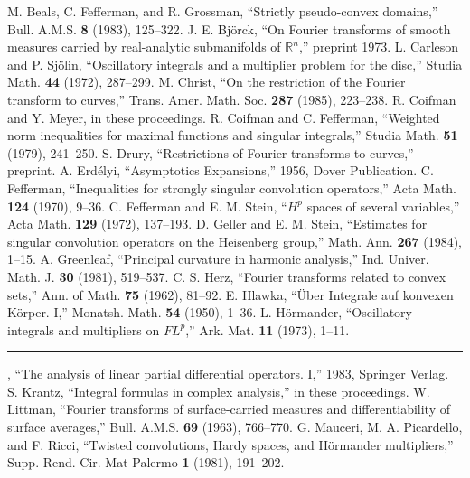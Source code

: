 \documentclass[
  BookTitleCN={傅里叶分析中的振动积分},
  BookTitleEN={Oscillatory Integrals in Fourier Analysis},
  OriginalAuthor={E.~M. Stein},
  OriginalEdition={Proc. Sympos. Pure Math. 35, Part~1},
  OriginalPublisher={American Mathematical Society},
  OriginalYear={1979},
  Translator={翻译及重排},
  ModelUsed={Codex CLI},
  Biblatex=false,
  TranslationDate={2026年8月27日}
]{mathtranslation}
\numberwithin{equation}{chapter}   %
\newcommand{\R}{\mathbb{R}}
\begin{document}
\begin{thebibliography}{33}
 M. Beals, C. Fefferman, and R. Grossman, ``Strictly pseudo-convex domains,'' Bull. A.M.S. \textbf{8} (1983), 125--322.
 J. E. Bj\"orck, ``On Fourier transforms of smooth measures carried by real-analytic submanifolds of $\R^{n}$,'' preprint 1973.
 L. Carleson and P. Sj\"olin, ``Oscillatory integrals and a multiplier problem for the disc,'' Studia Math. \textbf{44} (1972), 287--299.
 M. Christ, ``On the restriction of the Fourier transform to curves,'' Trans. Amer. Math. Soc. \textbf{287} (1985), 223--238.
 R. Coifman and Y. Meyer, in these proceedings.
 R. Coifman and C. Fefferman, ``Weighted norm inequalities for maximal functions and singular integrals,'' Studia Math. \textbf{51} (1979), 241--250.
 S. Drury, ``Restrictions of Fourier transforms to curves,'' preprint.
 A. Erd\'elyi, ``Asymptotics Expansions,'' 1956, Dover Publication.
 C. Fefferman, ``Inequalities for strongly singular convolution operators,'' Acta Math. \textbf{124} (1970), 9--36.
 C. Fefferman and E. M. Stein, ``$H^{p}$ spaces of several variables,'' Acta Math. \textbf{129} (1972), 137--193.
 D. Geller and E. M. Stein, ``Estimates for singular convolution operators on the Heisenberg group,'' Math. Ann. \textbf{267} (1984), 1--15.
 A. Greenleaf, ``Principal curvature in harmonic analysis,'' Ind. Univer. Math. J. \textbf{30} (1981), 519--537.
 C. S. Herz, ``Fourier transforms related to convex sets,'' Ann. of Math. \textbf{75} (1962), 81--92.
 E. Hlawka, ``\"Uber Integrale auf konvexen K\"orper. I,'' Monatsh. Math. \textbf{54} (1950), 1--36.
 L. H\"ormander, ``Oscillatory integrals and multipliers on $FL^{p}$,'' Ark. Mat. \textbf{11} (1973), 1--11.
 \hspace{0.5em}\rule[0.4ex]{1.4em}{0.4pt}, ``The analysis of linear partial differential operators. I,'' 1983, Springer Verlag.
 S. Krantz, ``Integral formulas in complex analysis,'' in these proceedings.
 W. Littman, ``Fourier transforms of surface-carried measures and differentiability of surface averages,'' Bull. A.M.S. \textbf{69} (1963), 766--770.
 G. Mauceri, M. A. Picardello, and F. Ricci, ``Twisted convolutions, Hardy spaces, and H\"ormander multipliers,'' Supp. Rend. Cir. Mat-Palermo \textbf{1} (1981), 191--202.

\end{thebibliography}
\end{document}
